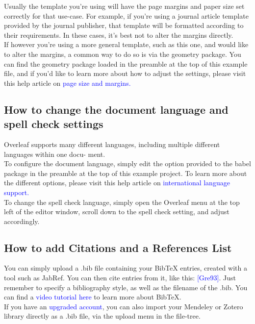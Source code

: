 \documentclass{article}
\begin{document}
	Usually the template you’re using will have the page margins and paper size set correctly for that
	use-case. For example, if you’re using a journal article template provided by the journal publisher,
	that template will be formatted according to their requirements. In these cases, it’s best not to alter
	the margins directly.\\
	\hspace{1cm}  If however you’re using a more general template, such as this one, and would like to alter the
	margins, a common way to do so is via the geometry package. You can find the geometry package
	loaded in the preamble at the top of this example file, and if you’d like to learn more about how to
	adjust the settings, please visit this help article on \textcolor{blue}{page size and margins.}
	
	\newpage
	
	\subsection{How to change the document language and spell check settings}
	Overleaf supports many different languages, including multiple different languages within one docu-
	ment.\\
	\hspace{1cm} To configure the document language, simply edit the option provided to the babel package in the
	preamble at the top of this example project. To learn more about the different options, please visit
	this help article on \textcolor{blue}{international language support.}\\
	\hspace{1cm} To change the spell check language, simply open the Overleaf menu at the top left of the editor
	window, scroll down to the spell check setting, and adjust accordingly.
	
	\subsection{How to add Citations and a References List}
	
	You can simply upload a .bib file containing your BibTeX entries, created with a tool such as JabRef.
	You can then cite entries from it, like this:\textcolor{blue}{ [Gre93]}. Just remember to specify a bibliography style, as
	well as the filename of the .bib. You can find a\textcolor{blue}{ video tutorial here} to learn more about BibTeX.\\
	\hspace{1cm}  If you have an\textcolor{blue}{ upgraded account}, you can also import your Mendeley or Zotero library directly as
	a .bib file, via the upload menu in the file-tree.
	
\end{document}
